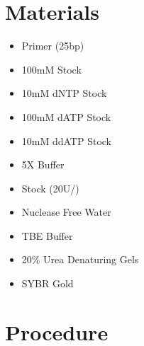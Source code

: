 \documentclass{ssiBio}
\begin{document}
\section{Materials}
\begin{itemize}
\item{Primer (25bp)}
\item{100mM \BdATP{} Stock}
\item{10mM dNTP Stock}
\item{100mM dATP Stock}
\item{10mM ddATP Stock}
\item{5X \tdt{} Buffer}
\item{\tdt{} Stock (20U/\uL{})} %
\item{Nuclease Free Water}
\item{TBE Buffer}
\item{20\% Urea Denaturing Gels}
\item{SYBR Gold}
\end{itemize}

\section{Procedure}%
\end{document}

